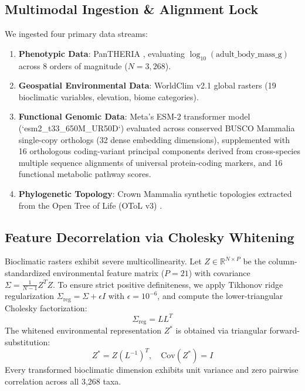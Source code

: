 \documentclass[sigconf,nonacm]{acmart}
\begin{document}
\subsection{Multimodal Ingestion \& Alignment Lock}
We ingested four primary data streams:
\begin{enumerate}
    \item \textbf{Phenotypic Data}: PanTHERIA \cite{jones2009pantheria}, evaluating $\log_{10}(\text{adult\_body\_mass\_g})$ across 8 orders of magnitude ($N=3,268$).
    \item \textbf{Geospatial Environmental Data}: WorldClim v2.1 global rasters \cite{fick2017worldclim} (19 bioclimatic variables, elevation, biome categories).
    \item \textbf{Functional Genomic Data}: Meta's ESM-2 transformer model (`esm2\_t33\_650M\_UR50D`) \cite{lin2023evolutionary} evaluated across conserved BUSCO Mammalia single-copy orthologs \cite{waterhouse2018busco} (32 dense embedding dimensions), supplemented with 16 orthologous coding-variant principal components derived from cross-species multiple sequence alignments of universal protein-coding markers, and 16 functional metabolic pathway scores.
    \item \textbf{Phylogenetic Topology}: Crown Mammalia synthetic topologies extracted from the Open Tree of Life (OToL v3) \cite{hinchliff2015synthesis}.
\end{enumerate}

\subsection{Feature Decorrelation via Cholesky Whitening}
Bioclimatic rasters exhibit severe multicollinearity. Let $Z \in \mathbb{R}^{N \times P}$ be the column-standardized environmental feature matrix ($P = 21$) with covariance $\Sigma = \frac{1}{N - 1} Z^T Z$. To ensure strict positive definiteness, we apply Tikhonov ridge regularization $\Sigma_{\text{reg}} = \Sigma + \epsilon I$ with $\epsilon = 10^{-6}$, and compute the lower-triangular Cholesky factorization:
\begin{equation}
\Sigma_{\text{reg}} = L L^T
\end{equation}
The whitened environmental representation $Z^*$ is obtained via triangular forward-substitution:
\begin{equation}
Z^* = Z (L^{-1})^T, \quad \text{Cov}(Z^*) = I
\end{equation}
Every transformed bioclimatic dimension exhibits unit variance and zero pairwise correlation across all 3,268 taxa.
\end{document}
